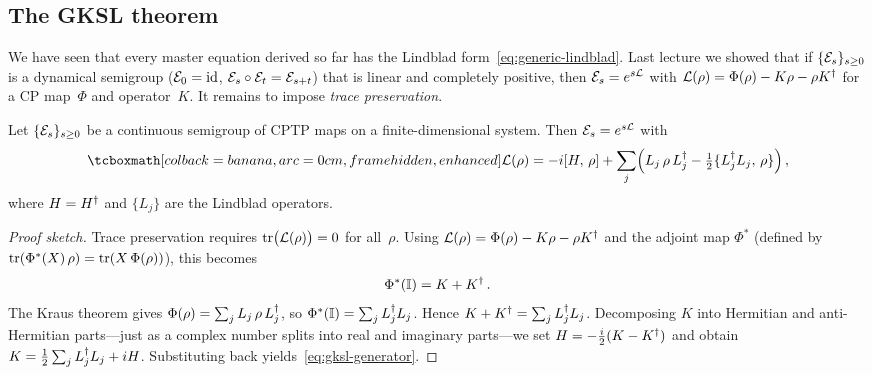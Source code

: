 

\subsection{The GKSL theorem}\label{sec:gksl-theorem}

We have seen that every master equation derived so far has the
Lindblad form~\eqref{eq:generic-lindblad}.  Last lecture we showed
that if $\{\mathcal{E}_s\}_{s\ge0}$ is a dynamical semigroup
($\mathcal{E}_0 = \operatorname{id}$, $\mathcal{E}_s \circ \mathcal{E}_t = \mathcal{E}_{s+t}$) that is
linear and completely positive, then $\mathcal{E}_s = e^{s\mathcal{L}}$
with $\mathcal{L}(\rho) = \Phi(\rho) - K\rho - \rho K^\dagger$ for a
CP map~$\Phi$ and operator~$K$.  It remains to impose \emph{trace
preservation}.

\begin{theorem}%
\label{thm:gksl}
  Let $\{\mathcal{E}_s\}_{s\ge0}$ be a continuous semigroup of CPTP maps on
  a finite-dimensional system.  Then $\mathcal{E}_s = e^{s\mathcal{L}}$
  with
  \begin{equation}\label{eq:gksl-generator}
    \eqbox{\mathcal{L}(\rho)
    = -i[H,\,\rho]
      + \sum_j \Bigl(
        L_j\,\rho\, L_j^\adj
        - \tfrac{1}{2}\{L_j^\adj L_j,\,\rho\}
      \Bigr)}\,,
  \end{equation}
  where $H = H^\dagger$ and $\{L_j\}$ are the Lindblad operators.
\end{theorem}

\begin{proof}[Proof sketch]
  Trace preservation requires
  $\operatorname{tr}\bigl(\mathcal{L}(\rho)\bigr) = 0$ for all~$\rho$.  Using
  $\mathcal{L}(\rho) = \Phi(\rho) - K\rho - \rho K^\dagger$ and the
  adjoint map $\Phi^*$ (defined by
  $\operatorname{tr}(\Phi^*(X)\,\rho) = \operatorname{tr}(X\,\Phi(\rho))$), this becomes
  \begin{equation}\label{eq:tp-condition}
    \Phi^*(\mathbb{I}) = K + K^\dagger\,.
  \end{equation}
  The Kraus theorem gives
  $\Phi(\rho) = \sum_j L_j\,\rho\, L_j^\dagger$, so
  $\Phi^*(\mathbb{I}) = \sum_j L_j^\dagger L_j$.  Hence
  $K + K^\dagger = \sum_j L_j^\dagger L_j$.  Decomposing $K$ into
  Hermitian and anti-Hermitian parts---just as a complex number splits
  into real and imaginary parts---we set
  $H = -\tfrac{i}{2}(K - K^\dagger)$ and obtain
  $K = \tfrac{1}{2}\sum_j L_j^\dagger L_j + iH$.
  Substituting back yields~\eqref{eq:gksl-generator}.
\end{proof}

